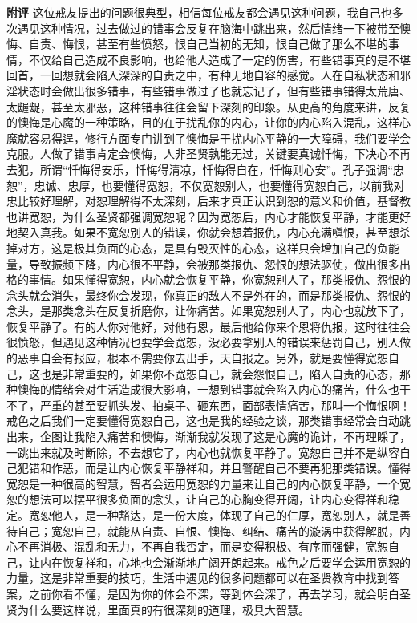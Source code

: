 \begin{case}
    \textbf{附评} 这位戒友提出的问题很典型，相信每位戒友都会遇见这种问题，我自己也多次遇见这种情况，过去做过的错事会反复在脑海中跳出来，然后情绪一下被带至懊悔、自责、悔恨，甚至有些愤怒，恨自己当初的无知，恨自己做了那么不堪的事情，不仅给自己造成不良影响，也给他人造成了一定的伤害，有些错事真的是不堪回首，一回想就会陷入深深的自责之中，有种无地自容的感觉。人在自私状态和邪淫状态时会做出很多错事，有些错事做过了也就忘记了，但有些错事错得太荒唐、太龌龊，甚至太邪恶，这种错事往往会留下深刻的印象。从更高的角度来讲，反复的懊悔是心魔的一种策略，目的在于扰乱你的内心，让你的内心陷入混乱，这样心魔就容易得逞，修行方面专门讲到了懊悔是干扰内心平静的一大障碍，我们要学会克服。人做了错事肯定会懊悔，人非圣贤孰能无过，关键要真诚忏悔，下决心不再去犯，所谓“忏悔得安乐，忏悔得清凉，忏悔得自在，忏悔则心安”。孔子强调“忠恕”，忠诚、忠厚，也要懂得宽恕，不仅宽恕别人，也要懂得宽恕自己，以前我对忠比较好理解，对恕理解得不太深刻，后来才真正认识到恕的意义和价值，基督教也讲宽恕，为什么圣贤都强调宽恕呢？因为宽恕后，内心才能恢复平静，才能更好地契入真我。如果不宽恕别人的错误，你就会想着报仇，内心充满嗔恨，甚至想杀掉对方，这是极其负面的心态，是具有毁灭性的心态，这样只会增加自己的负能量，导致振频下降，内心很不平静，会被那类报仇、怨恨的想法驱使，做出很多出格的事情。如果懂得宽恕，内心就会恢复平静，你宽恕别人了，那类报仇、怨恨的念头就会消失，最终你会发现，你真正的敌人不是外在的，而是那类报仇、怨恨的念头，是那类念头在反复折磨你，让你痛苦。如果宽恕别人了，内心也就放下了，恢复平静了。有的人你对他好，对他有恩，最后他给你来个恩将仇报，这时往往会很愤怒，但遇见这种情况也要学会宽恕，没必要拿别人的错误来惩罚自己，别人做的恶事自会有报应，根本不需要你去出手，天自报之。另外，就是要懂得宽恕自己，这也是非常重要的，如果你不宽恕自己，就会怨恨自己，陷入自责的心态，那种懊悔的情绪会对生活造成很大影响，一想到错事就会陷入内心的痛苦，什么也干不了，严重的甚至要抓头发、拍桌子、砸东西，面部表情痛苦，那叫一个悔恨啊！戒色之后我们一定要懂得宽恕自己，这也是我的经验之谈，那类错事经常会自动跳出来，企图让我陷入痛苦和懊悔，渐渐我就发现了这是心魔的诡计，不再理睬了，一跳出来就及时断除，不去想它了，内心也就恢复平静了。宽恕自己并不是纵容自己犯错和作恶，而是让内心恢复平静祥和，并且警醒自己不要再犯那类错误。懂得宽恕是一种很高的智慧，智者会运用宽恕的力量来让自己的内心恢复平静，一个宽恕的想法可以摆平很多负面的念头，让自己的心胸变得开阔，让内心变得祥和稳定。宽恕他人，是一种豁达，是一份大度，体现了自己的仁厚，宽恕别人，就是善待自己；宽恕自己，就能从自责、自恨、懊悔、纠结、痛苦的漩涡中获得解脱，内心不再消极、混乱和无力，不再自我否定，而是变得积极、有序而强健，宽恕自己，让内在恢复祥和，心地也会渐渐地广阔开朗起来。戒色之后要学会运用宽恕的力量，这是非常重要的技巧，生活中遇见的很多问题都可以在圣贤教育中找到答案，之前你看不懂，是因为你的体会不深，等到体会深了，再去学习，就会明白圣贤为什么要这样说，里面真的有很深刻的道理，极具大智慧。
\end{case}

